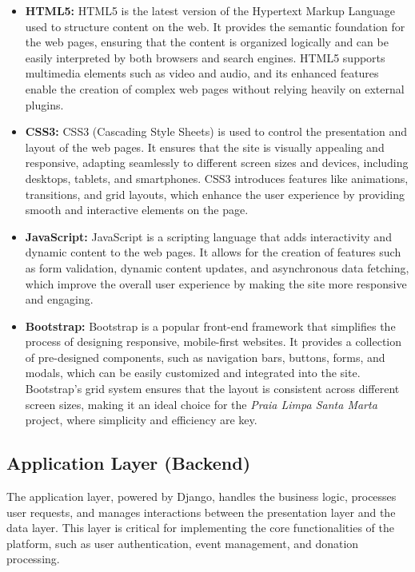 \begin{itemize}
    \item \textbf{HTML5:} HTML5\cite{html5} is the latest version of the Hypertext Markup Language used to structure content on the web. It provides the semantic foundation for the web pages, ensuring that the content is organized logically and can be easily interpreted by both browsers and search engines. HTML5 supports multimedia elements such as video and audio, and its enhanced features enable the creation of complex web pages without relying heavily on external plugins.

    \item \textbf{CSS3:} CSS3\cite{css3} (Cascading Style Sheets) is used to control the presentation and layout of the web pages. It ensures that the site is visually appealing and responsive, adapting seamlessly to different screen sizes and devices, including desktops, tablets, and smartphones. CSS3 introduces features like animations, transitions, and grid layouts, which enhance the user experience by providing smooth and interactive elements on the page.

    \item \textbf{JavaScript:} JavaScript\cite{javascript} is a scripting language that adds interactivity and dynamic content to the web pages. It allows for the creation of features such as form validation, dynamic content updates, and asynchronous data fetching, which improve the overall user experience by making the site more responsive and engaging.

    \item \textbf{Bootstrap:} Bootstrap\cite{bootstrap} is a popular front-end framework that simplifies the process of designing responsive, mobile-first websites. It provides a collection of pre-designed components, such as navigation bars, buttons, forms, and modals, which can be easily customized and integrated into the site. Bootstrap’s grid system ensures that the layout is consistent across different screen sizes, making it an ideal choice for the \textit{Praia Limpa Santa Marta} project, where simplicity and efficiency are key.
\end{itemize}

\subsection{Application Layer (Backend)}

The application layer, powered by Django\cite{django}, handles the business logic, processes user requests, and manages interactions between the presentation layer and the data layer. This layer is critical for implementing the core functionalities of the platform, such as user authentication, event management, and donation processing.

